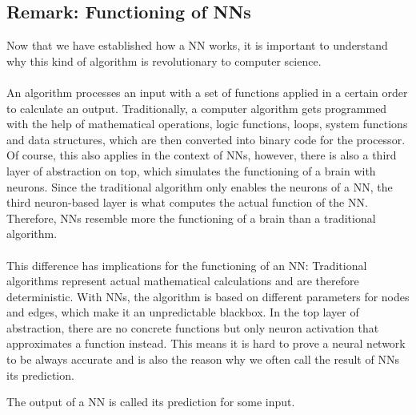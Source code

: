 \documentclass[11pt]{report}
\newcommand{\mydeflabel}{}
\newenvironment{mydef}[1]
 {\renewcommand\mydeflabel{#1}\begin{mydefinner}}
 {\end{mydefinner}}
\begin{document}
            \subsection{Remark: Functioning of NNs}\label{subsec:remark-about-the-funtioning-of-nns}
    Now that we have established how a NN works, it is important to understand why this kind of algorithm is revolutionary to computer science.
    \\ \\
    An algorithm processes an input with a set of functions applied in a certain order to calculate an output.
    Traditionally, a computer algorithm gets programmed with the help of mathematical operations, logic functions, loops, system functions and data structures, which are then converted into binary code for the processor.
    Of course, this also applies in the context of NNs, however, there is also a third layer of abstraction on top, which simulates the functioning of a brain with neurons.
    Since the traditional algorithm only enables the neurons of a NN, the third neuron-based layer is what computes the actual function of the NN\@.
    Therefore, NNs resemble more the functioning of a brain than a traditional algorithm.
    \\ \\
    This difference has implications for the functioning of an NN:
    Traditional algorithms represent actual mathematical calculations and are therefore deterministic.
    With NNs, the algorithm is based on different parameters for nodes and edges, which make it an unpredictable blackbox.
    In the top layer of abstraction, there are no concrete functions but only neuron activation that approximates a function instead.
    This means it is hard to prove a neural network to be always accurate and is also the reason why we often call the result of NNs its prediction.
    \begin{mydef}{NN Prediction}
        The output of a NN is called its prediction for some input.
    \end{mydef}
\end{document}
